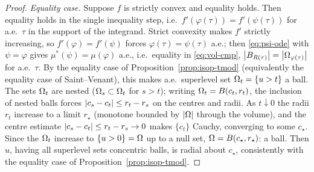 \begin{proof}
\emph{Equality case.} Suppose $f$ is strictly convex and equality holds.
Then equality holds in the single inequality step, i.e.\
$f'(\varphi(\tau))=f'(\psi(\tau))$ for a.e.\ $\tau$ in the support of the
integrand. Strict convexity makes $f'$ strictly increasing, so $f'(\varphi)
=f'(\psi)$ forces $\varphi(\tau)=\psi(\tau)$ a.e.; then \eqref{eq:psi-ode}
with $\psi=\varphi$ gives $\mu^*(\psi)=\mu(\varphi)$ a.e., i.e.\ equality in
\eqref{eq:vol-cmp}, $\left|B_{R(\tau)}\right|=\left|\Omega_{\varphi(\tau)}\right|$ for a.e.\
$\tau$. By the equality case of Proposition~\ref{prop:isop-tmod} (equivalently
the equality case of Saint--Venant), this makes a.e.\ superlevel set
$\Omega_t=\{u>t\}$ a ball. The sets $\Omega_t$ are nested ($\Omega_s\subset\Omega_t$ for
$s>t$); writing $\Omega_t=B(c_t,r_t)$, the inclusion of nested balls forces
$\left|c_s-c_t\right|\le r_t-r_s$ on the centres and radii. As $t\downarrow0$ the
radii $r_t$ increase to a limit $r_\star$ (monotone bounded by $\left|\Omega\right|$
through the volume), and the centre estimate $\left|c_s-c_t\right|\le r_t-r_s\to0$
makes $\{c_t\}$ Cauchy, converging to some $c_\star$. Since the $\Omega_t$
increase to $\{u>0\}=\Omega$ up to a null set, $\Omega=B(c_\star,r_\star)$: a ball.
Then $u$, having all superlevel sets concentric balls, is radial about
$c_\star$, consistently with the equality case of
Proposition~\ref{prop:isop-tmod}.
\end{proof}

